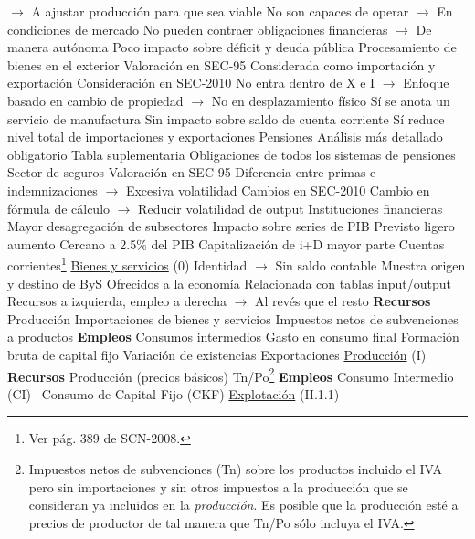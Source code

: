 \documentclass{nuevotema}
\begin{document}
\begin{esquemal}
				\4[] $\to$ A ajustar producción para que sea viable
				\4[] No son capaces de operar
				\4[] $\to$ En condiciones de mercado
				\4[] No pueden contraer obligaciones financieras
				\4[] $\to$ De manera autónoma
				\4 Poco impacto sobre déficit y deuda pública
			\3 Procesamiento de bienes en el exterior
				\4 Valoración en SEC-95
				\4[] Considerada como importación y exportación
				\4 Consideración en SEC-2010
				\4[] No entra dentro de X e I
				\4[] $\to$ Enfoque basado en cambio de propiedad
				\4[] $\to$ No en desplazamiento físico
				\4[] Sí se anota un servicio de manufactura
				\4 Sin impacto sobre saldo de cuenta corriente
				\4 Sí reduce nivel total de importaciones y exportaciones
			\3 Pensiones
				\4 Análisis más detallado obligatorio
				\4 Tabla suplementaria
				\4[] Obligaciones de todos los sistemas de pensiones
			\3 Sector de seguros
				\4 Valoración en SEC-95
				\4[] Diferencia entre primas e indemnizaciones
				\4[] $\to$ Excesiva volatilidad
				\4 Cambios en SEC-2010
				\4[] Cambio en fórmula de cálculo
				\4[] $\to$ Reducir volatilidad de output
			\3 Instituciones financieras
				\4 Mayor desagregación de subsectores
			\3 Impacto sobre series de PIB
				\4 Previsto ligero aumento
				\4[] Cercano a 2.5\% del PIB
				\4 Capitalización de i+D mayor parte
		\2 Cuentas corrientes\footnote{Ver pág. 389 de SCN-2008.}
			\3 \underline{Bienes y servicios} (0)
				\4 Identidad
				\4[] $\to$ Sin saldo contable
				\4 Muestra origen y destino de ByS
				\4[] Ofrecidos a la economía
				\4 Relacionada con tablas input/output
				\4 Recursos a izquierda, empleo a derecha
				\4[] $\to$ Al revés que el resto
				\4 \textbf{Recursos}
				\4[] Producción
				\4[] Importaciones de bienes y servicios
				\4[] Impuestos netos de subvenciones a productos
				\4 \textbf{Empleos}
				\4[] Consumos intermedios
				\4[] Gasto en consumo final
				\4[] Formación bruta de capital fijo
				\4[] Variación de existencias
				\4[] Exportaciones
			\3 \underline{Producción} (I)
				\4 \textbf{Recursos}
				\4[] Producción (precios básicos)
				\4[] Tn/Po\footnote{Impuestos netos de subvenciones (Tn) sobre los productos incluido el IVA pero sin importaciones y sin otros impuestos a la producción que se consideran ya incluidos en la \textit{producción}. Es posible que la producción esté a precios de productor de tal manera que Tn/Po sólo incluya el IVA.}
				\4 \textbf{Empleos}
				\4[] Consumo Intermedio (CI)
				\4[] 
				\4[] --Consumo de Capital Fijo (CKF)
				\4[] 
			\3 \underline{Explotación} (II.1.1)

\end{esquemal}
\end{document}

